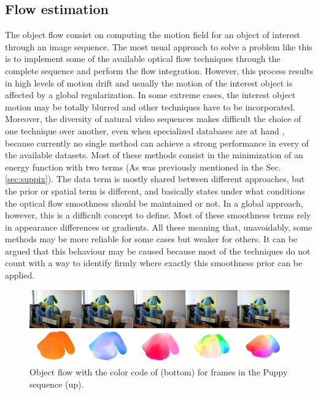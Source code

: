 \subsection{Flow estimation}
\label{sec:core}

The object flow consist on computing the motion field for an object of interest through an image
sequence. The most usual approach to solve a problem like this is to implement some of the available
optical flow techniques through the complete sequence and perform the flow integration. 
However, this process results in high levels of motion drift \cite{c18}\cite{c19} and usually the motion of the interest
object is affected by a global regularization. In some extreme cases, the interest object motion
may be totally blurred and other techniques have to be incorporated. Moreover, the diversity
of natural video sequences makes difficult the choice of one technique over another, even when specialized
databases are at hand \cite{c17}, because currently no single method can achieve a strong 
performance in every of the available datasets. Most of these methods consist in the minimization 
of an energy function with two terms (As was previously mentioned in the Sec. \ref{sec:suppix}). The data
term is mostly shared between different approaches, but the prior or spatial term is different, and basically states 
under what conditions the optical flow smoothness should be maintained or not. In a global approach, however,
this is a difficult concept to define. Most of these smoothness terms rely in appearance differences or gradients.
All these meaning that, unavoidably, some methods may be more reliable for some cases but weaker for others. 
It can be argued that this behaviour may be caused because most of the techniques do not count with a way to identify 
firmly where exactly this smoothness prior can be applied. 
   \begin{figure}[thpb]
      \centering
      \includegraphics[width=1.0\textwidth]{../images/objectflow.png}
      \caption{Object flow with the color code of \cite{c17} (bottom) for frames in the Puppy sequence (up). }
      \label{of}
   \end{figure}

